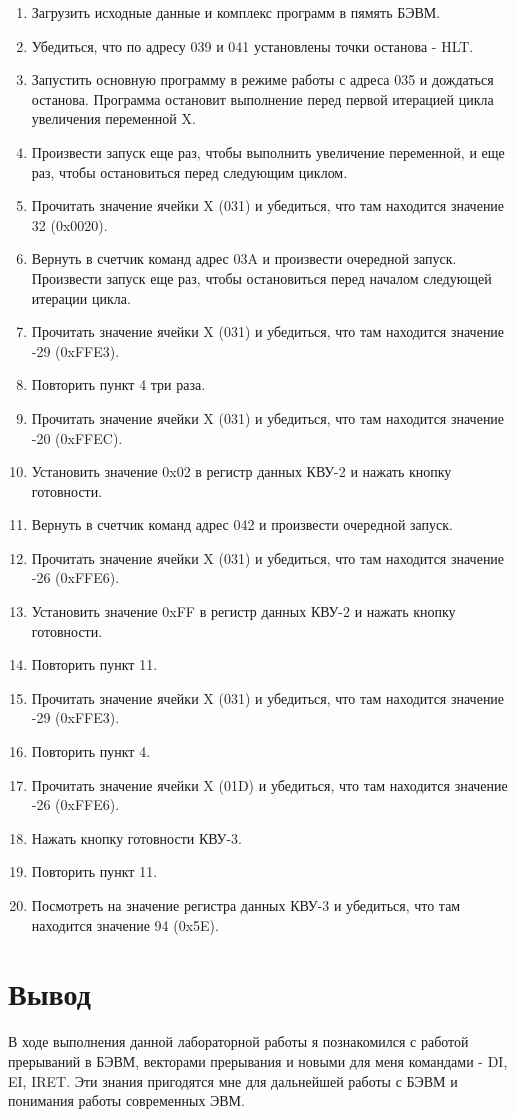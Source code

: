 \begin{enumerate}
\item Загрузить исходные данные и комплекс программ в пямять БЭВМ.
\item Убедиться, что по адресу 039 и 041 установлены точки останова - HLT.
\item Запустить основную программу в режиме работы с адреса 035 и дождаться останова. Программа остановит выполнение перед первой итерацией цикла увеличения переменной X.
\item Произвести запуск еще раз, чтобы выполнить увеличение переменной, и еще раз, чтобы остановиться перед следующим циклом.
\item Прочитать значение ячейки X (031) и убедиться, что там находится значение 32 (0x0020).
\item Вернуть в счетчик команд адрес 03A и произвести очередной запуск. Произвести запуск еще раз, чтобы остановиться перед началом следующей итерации цикла.
\item Прочитать значение ячейки X (031) и убедиться, что там находится значение -29 (0xFFE3).
\item Повторить пункт 4 три раза.
\item Прочитать значение ячейки X (031) и убедиться, что там находится значение -20 (0xFFEC).
\item Установить значение 0x02 в регистр данных КВУ-2 и нажать кнопку готовности.
\item Вернуть в счетчик команд адрес 042 и произвести очередной запуск.
\item Прочитать значение ячейки X (031) и убедиться, что там находится значение -26 (0xFFE6).
\item Установить значение 0xFF в регистр данных КВУ-2 и нажать кнопку готовности.
\item Повторить пункт 11.
\item Прочитать значение ячейки X (031) и убедиться, что там находится значение -29 (0xFFE3).
\item Повторить пункт 4.
\item Прочитать значение ячейки X (01D) и убедиться, что там находится значение -26 (0xFFE6).
\item Нажать кнопку готовности КВУ-3.
\item Повторить пункт 11.
\item Посмотреть на значение регистра данных КВУ-3 и убедиться, что там находится значение 94 (0x5E).
\end{enumerate}

\section{Вывод}
В ходе выполнения данной лабораторной работы я познакомился с работой прерываний в БЭВМ, векторами прерывания и новыми для меня командами - DI, EI, IRET. Эти знания пригодятся мне для дальнейшей работы с БЭВМ и понимания работы современных ЭВМ.
